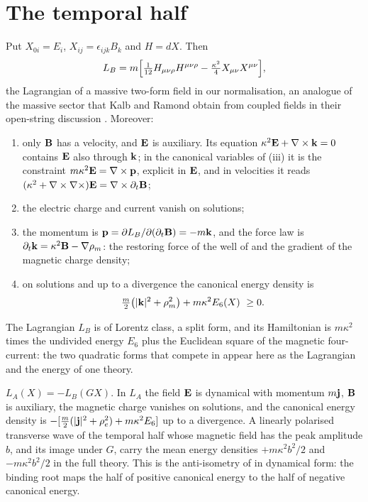 \section{The temporal half}

\begin{theorem}
\label{thm:temporal}
Put $X_{0i}=E_i$, $X_{ij}=\epsilon_{ijk}B_k$ and $H=dX$. Then
\begin{equation}
\label{eq:KR}
L_B=m\Bigl[\tfrac1{12}H_{\mu\nu\rho}H^{\mu\nu\rho}-\tfrac{\kappa^2}4X_{\mu\nu}X^{\mu\nu}\Bigr],
\end{equation}
the Lagrangian of a massive two-form field in our normalisation, an analogue of the massive sector that Kalb and Ramond obtain from
coupled fields in their open-string discussion \cite{KalbRamond74}. Moreover:
\begin{enumerate}[label=(\roman*),leftmargin=2.2em,itemsep=1pt]
\item only $\mathbf B$ has a velocity, and $\mathbf E$ is auxiliary. Its equation $\kappa^2\mathbf E+\nabla\times\mathbf k=0$ contains $\mathbf E$ also through $\mathbf k$; in the
canonical variables of (iii) it is the constraint $m\kappa^2\mathbf E=\nabla\times\mathbf p$, explicit in $\mathbf E$, and in velocities it reads
$(\kappa^2+\nabla\times\nabla\times)\mathbf E=\nabla\times\partial_t\mathbf B$;
\item the electric charge and current vanish on solutions;
\item the momentum is $\mathbf p=\partial L_B/\partial(\partial_t\mathbf B)=-m\mathbf k$, and the force law is $\partial_t\mathbf k=\kappa^2\mathbf B-\nabla\rho_m$: the
restoring force of the well of  and the gradient of the magnetic charge density;
\item on solutions and up to a divergence the canonical energy density is
\begin{equation}
\label{eq:energyB}
\tfrac m2\bigl(|\mathbf k|^2+\rho_m^2\bigr)+m\kappa^2E_6(X)\ \ge0 .
\end{equation}
\end{enumerate}
\end{theorem}

The Lagrangian $L_B$ is of Lorentz class, a split form, and its Hamiltonian is $m\kappa^2$ times the undivided energy $E_6$ plus the
Euclidean square of the magnetic four-current: the two quadratic forms that compete in  appear here as the Lagrangian and the
energy of one theory.

\begin{proposition}
\label{prop:mirror}
$L_A(X)=-L_B(GX)$. In $L_A$ the field $\mathbf E$ is dynamical with momentum $m\mathbf j$, $\mathbf B$ is auxiliary, the magnetic charge vanishes on
solutions, and the canonical energy density is $-[\tfrac m2(|\mathbf j|^2+\rho_e^2)+m\kappa^2E_6]$ up to a divergence. A linearly polarised
transverse wave of the temporal half whose magnetic field has the peak amplitude $b$, and its image under $G$, carry the mean energy densities $+m\kappa^2b^2/2$ and
$-m\kappa^2b^2/2$ in the full theory. This is the anti-isometry of  in dynamical form: the binding root maps the half of
positive canonical energy to the half of negative canonical energy.
\end{proposition}

